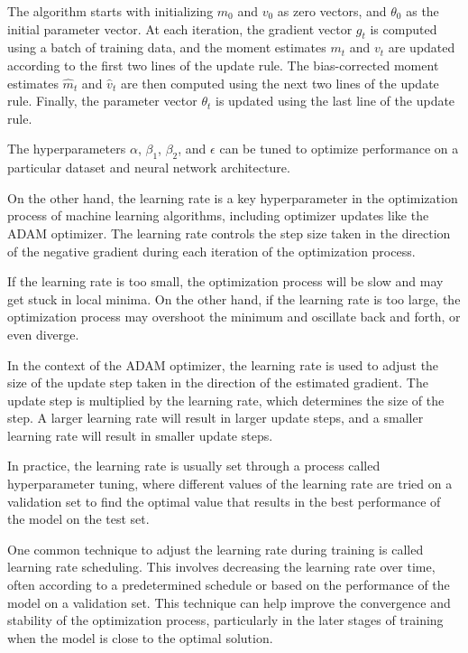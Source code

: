 The algorithm starts with initializing $m_0$ and $v_0$ as zero vectors, and $\theta_0$ as the initial parameter vector. At each iteration, the gradient vector $g_t$ is computed using a batch of training data, and the moment estimates $m_t$ and $v_t$ are updated according to the first two lines of the update rule. The bias-corrected moment estimates $\hat{m}_t$ and $\hat{v}_t$ are then computed using the next two lines of the update rule. Finally, the parameter vector $\theta_t$ is updated using the last line of the update rule.

The hyperparameters $\alpha$, $\beta_1$, $\beta_2$, and $\epsilon$ can be tuned to optimize performance on a particular dataset and neural network architecture.

On the other hand, the learning rate is a key hyperparameter in the optimization process of machine learning algorithms, including optimizer updates like the ADAM optimizer. The learning rate controls the step size taken in the direction of the negative gradient during each iteration of the optimization process.

If the learning rate is too small, the optimization process will be slow and may get stuck in local minima. On the other hand, if the learning rate is too large, the optimization process may overshoot the minimum and oscillate back and forth, or even diverge.

In the context of the ADAM optimizer, the learning rate is used to adjust the size of the update step taken in the direction of the estimated gradient. The update step is multiplied by the learning rate, which determines the size of the step. A larger learning rate will result in larger update steps, and a smaller learning rate will result in smaller update steps.

In practice, the learning rate is usually set through a process called hyperparameter tuning, where different values of the learning rate are tried on a validation set to find the optimal value that results in the best performance of the model on the test set.

One common technique to adjust the learning rate during training is called learning rate scheduling. This involves decreasing the learning rate over time, often according to a predetermined schedule or based on the performance of the model on a validation set. This technique can help improve the convergence and stability of the optimization process, particularly in the later stages of training when the model is close to the optimal solution.

